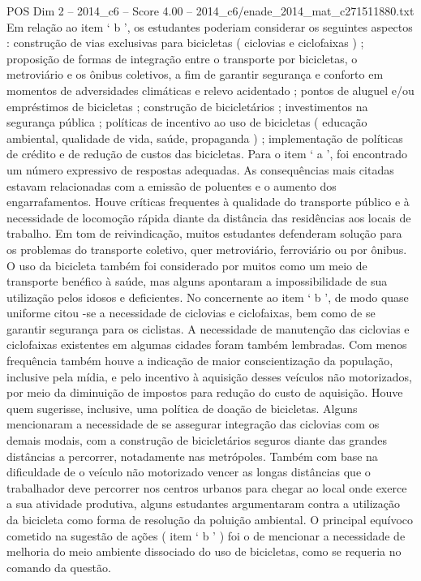 \begin{textsample}{POS Dim 2 – 2014\_c6 – Score 4.00 – 2014\_c6/enade\_2014\_mat\_c271511880.txt}
Em relação ao item ‘ b ’, os estudantes poderiam considerar os seguintes aspectos : construção de vias exclusivas para bicicletas ( ciclovias e ciclofaixas ) ; proposição de formas de integração entre o transporte por bicicletas, o metroviário e os ônibus coletivos, a fim de garantir segurança e conforto em momentos de adversidades climáticas e relevo acidentado ; pontos de aluguel e/ou empréstimos de bicicletas ; construção de bicicletários ; investimentos na segurança pública ; políticas de incentivo ao uso de bicicletas ( educação ambiental, qualidade de vida, saúde, propaganda ) ; implementação de políticas de crédito e de redução de custos das bicicletas.
Para o item ‘ a ’, foi encontrado um número expressivo de respostas adequadas.
As consequências mais citadas estavam relacionadas com a emissão de poluentes e o aumento dos engarrafamentos.
Houve críticas frequentes à qualidade do transporte público e à necessidade de locomoção rápida diante da distância das residências aos locais de trabalho.
Em tom de reivindicação, muitos estudantes defenderam solução para os problemas do transporte coletivo, quer metroviário, ferroviário ou por ônibus.
O uso da bicicleta também foi considerado por muitos como um meio de transporte benéfico à saúde, mas alguns apontaram a impossibilidade de sua utilização pelos idosos e deficientes.
No concernente ao item ‘ b ’, de modo quase uniforme citou -se a necessidade de ciclovias e ciclofaixas, bem como de se garantir segurança para os ciclistas.
A necessidade de manutenção das ciclovias e ciclofaixas existentes em algumas cidades foram também lembradas.
Com menos frequência também houve a indicação de maior conscientização da população, inclusive pela mídia, e pelo incentivo à aquisição desses veículos não motorizados, por meio da diminuição de impostos para redução do custo de aquisição.
Houve quem sugerisse, inclusive, uma política de doação de bicicletas.
Alguns mencionaram a necessidade de se assegurar integração das ciclovias com os demais modais, com a construção de bicicletários seguros diante das grandes distâncias a percorrer, notadamente nas metrópoles.
Também com base na dificuldade de o veículo não motorizado vencer as longas distâncias que o trabalhador deve percorrer nos centros urbanos para chegar ao local onde exerce a sua atividade produtiva, alguns estudantes argumentaram contra a utilização da bicicleta como forma de resolução da poluição ambiental.
O principal equívoco cometido na sugestão de ações ( item ‘ b ’ ) foi o de mencionar a necessidade de melhoria do meio ambiente dissociado do uso de bicicletas, como se requeria no comando da questão.

\end{textsample}
